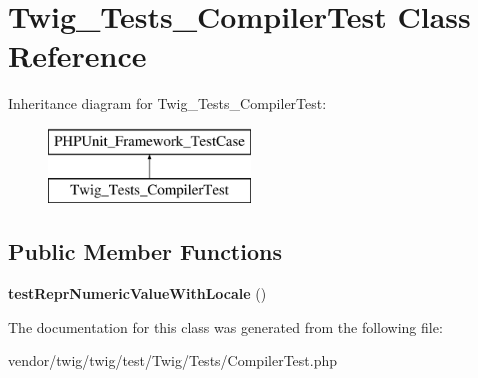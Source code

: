 \hypertarget{classTwig__Tests__CompilerTest}{}\section{Twig\+\_\+\+Tests\+\_\+\+Compiler\+Test Class Reference}
\label{classTwig__Tests__CompilerTest}
Inheritance diagram for Twig\+\_\+\+Tests\+\_\+\+Compiler\+Test\+:\begin{figure}[H]
\begin{center}
\leavevmode
\includegraphics[height=2.000000cm]{classTwig__Tests__CompilerTest}
\end{center}
\end{figure}
\subsection*{Public Member Functions}
\begin{DoxyCompactItemize}
\item 
{\bfseries test\+Repr\+Numeric\+Value\+With\+Locale} ()\hypertarget{classTwig__Tests__CompilerTest_a3bbf46459dd71ed2bd955a8984fe20f1}{}\label{classTwig__Tests__CompilerTest_a3bbf46459dd71ed2bd955a8984fe20f1}

\end{DoxyCompactItemize}


The documentation for this class was generated from the following file\+:\begin{DoxyCompactItemize}
\item 
vendor/twig/twig/test/\+Twig/\+Tests/Compiler\+Test.\+php\end{DoxyCompactItemize}
